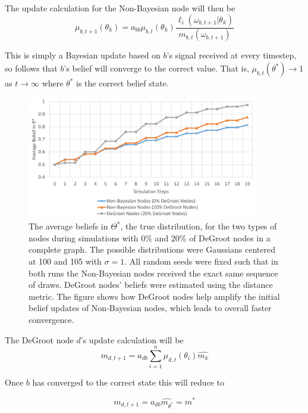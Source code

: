 \documentclass[letterpaper, 11pt, conference]{ieeeconf}
\begin{document}
The update calculation for the Non-Bayesian node will then be 
\begin{equation}
\mu_{b,t+1}(\theta_k) = a_{bb}\mu_{b,t}(\theta_k)\frac{\ell_i(\omega_{b,t+1}|\theta_k)}{m_{b,t}(\omega_{b,t+1})}
\end{equation}

This is simply a Bayesian update based on $b$'s signal received at every timestep, so follows that $b$'s belief will converge to the correct value.  That is, $\mu_{b,t}(\theta^*) \to 1$ as $t \to \infty$ where $\theta^*$ is the correct belief state.


\begin{figure}[t]
\centering
\includegraphics[width=0.9\textwidth]{figures/dg_faster}
\caption{The average beliefs in $\Theta^*$, the true distribution, for the two types of nodes during simulations with 0\% and 20\% of DeGroot nodes in a complete graph. The possible distributions were Gaussians centered at 100 and 105 with $\sigma=1$. All random seeds were fixed such that in both runs the Non-Bayesian nodes received the exact same sequence of draws. DeGroot nodes' beliefs were estimated using the distance metric. The figure shows how DeGroot nodes help amplify the initial belief updates of Non-Bayesian nodes, which leads to overall faster convergence.}
\label{fig:dg_faster}
\end{figure}

The DeGroot node $d$'s update calculation will be
\begin{equation}
m_{d,t+1} = a_{db}\sum_{i=1}^n\mu_{d,t}(\theta_i)\hat{m_k}
\end{equation}

Once $b$ has converged to the correct state this will reduce to 

\begin{equation}
m_{d,t+1} = a_{db}\hat{m_{\theta^*}} = m^*
\end{equation}
\end{document}
